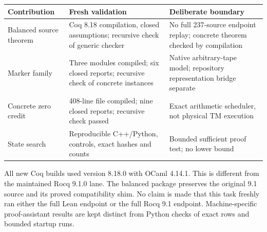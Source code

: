 \begin{center}
\begin{tabular}{@{}P{.27\textwidth}P{.32\textwidth}P{.31\textwidth}@{}}
\toprule
Contribution & Fresh validation & Deliberate boundary\\
\midrule
Balanced source theorem & Coq 8.18 compilation, closed assumptions;
recursive check of generic checker & No full 237-source endpoint replay;
concrete theorem checked by compilation\\[4pt]
Marker family & Three modules compiled; six closed reports; recursive
check of concrete instances & Native arbitrary-tape model;
repository representation bridge separate\\[4pt]
Concrete zero credit & 408-line file compiled; nine closed reports;
recursive check passed & Exact arithmetic scheduler, not physical TM execution\\[4pt]
State search & Reproducible C++/Python, controls, exact hashes and counts &
Bounded sufficient proof test; no lower bound\\
\bottomrule
\end{tabular}
\end{center}

All new Coq builds used version 8.18.0 with OCaml 4.14.1. This is different
from the maintained Rocq 9.1.0 lane. The balanced package preserves the
original 9.1 source and its proved compatibility shim. No claim is made that
this task freshly ran either the full Lean endpoint or the full Rocq 9.1
endpoint. Machine-specific proof-assistant results are kept distinct from
Python checks of exact rows and bounded startup runs.
